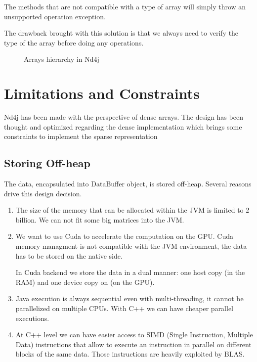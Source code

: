 The methods that are not compatible with a type of array will simply throw an unsupported operation exception.

The drawback brought with this solution is that we always need to verify the type of the array before doing any operations.
 
\begin{figure}[H]
	\begin{center}
		\label{fig:hierarchy}
		\caption{Arrays hierarchy in Nd4j}
	\end{center}
\end{figure}


\section{Limitations and Constraints}

Nd4j has been made with the perspective of dense arrays. The design has been thought and optimized regarding the dense implementation which brings some constraints to implement the sparse representation
\subsection{Storing Off-heap}

The data, encapsulated into DataBuffer object, is stored off-heap. Several reasons drive this design decision.
\begin{enumerate}
	\item The size of the memory that can be allocated within the JVM is limited to 2 billion. We can not fit some big matrices into the JVM.
	\item We want to use Cuda to accelerate the computation on the GPU. Cuda memory managment is not compatible with the JVM environment, the data has to be stored on the native side.
	
	In Cuda backend we store the data in a dual manner: one host copy (in the RAM) and one device copy on (on the GPU).
	
	\item Java execution is always sequential even with multi-threading, it cannot be parallelized on multiple CPUs. With C++ we can have cheaper parallel executions.
	\item At C++ level we can have easier access to SIMD (Single Instruction, Multiple Data) instructions that allow to execute an instruction in parallel on different blocks of the same data. Those instructions are heavily exploited by BLAS.
\end{enumerate}

